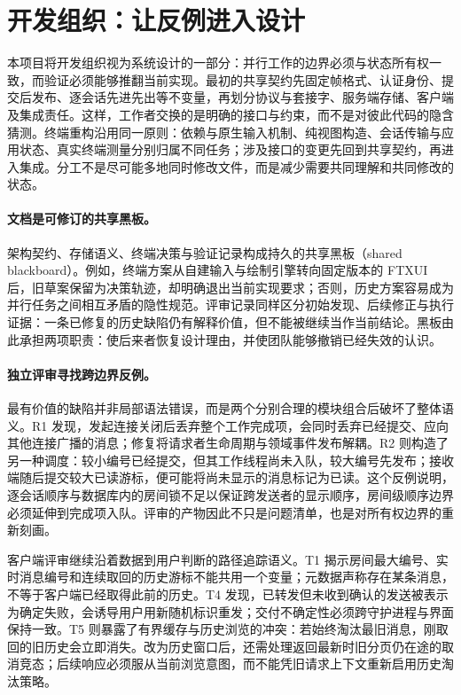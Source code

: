 \section{开发组织：让反例进入设计}
\label{sec:process}

本项目将开发组织视为系统设计的一部分：并行工作的边界必须与状态所有权一致，而验证必须能够推翻当前实现。最初的共享契约先固定帧格式、认证身份、提交后发布、逐会话先进先出等不变量，再划分协议与套接字、服务端存储、客户端及集成责任。这样，工作者交换的是明确的接口与约束，而不是对彼此代码的隐含猜测。终端重构沿用同一原则：依赖与原生输入机制、纯视图构造、会话传输与应用状态、真实终端测量分别归属不同任务；涉及接口的变更先回到共享契约，再进入集成。分工不是尽可能多地同时修改文件，而是减少需要共同理解和共同修改的状态。

\paragraph{文档是可修订的共享黑板。}
架构契约、存储语义、终端决策与验证记录构成持久的共享黑板（shared blackboard）。例如，终端方案从自建输入与绘制引擎转向固定版本的 FTXUI 后，旧草案保留为决策轨迹，却明确退出当前实现要求；否则，历史方案容易成为并行任务之间相互矛盾的隐性规范。评审记录同样区分初始发现、后续修正与执行证据：一条已修复的历史缺陷仍有解释价值，但不能被继续当作当前结论。黑板由此承担两项职责：使后来者恢复设计理由，并使团队能够撤销已经失效的认识。

\paragraph{独立评审寻找跨边界反例。}
最有价值的缺陷并非局部语法错误，而是两个分别合理的模块组合后破坏了整体语义。R1 发现，发起连接关闭后丢弃整个工作完成项，会同时丢弃已经提交、应向其他连接广播的消息；修复将请求者生命周期与领域事件发布解耦。R2 则构造了另一种调度：较小编号已经提交，但其工作线程尚未入队，较大编号先发布；接收端随后提交较大已读游标，便可能将尚未显示的消息标记为已读。这个反例说明，逐会话顺序与数据库内的房间锁不足以保证跨发送者的显示顺序，房间级顺序边界必须延伸到完成项入队。评审的产物因此不只是问题清单，也是对所有权边界的重新刻画。

客户端评审继续沿着数据到用户判断的路径追踪语义。T1 揭示房间最大编号、实时消息编号和连续取回的历史游标不能共用一个变量；元数据声称存在某条消息，不等于客户端已经取得此前的历史。T4 发现，已转发但未收到确认的发送被表示为确定失败，会诱导用户用新随机标识重发；交付不确定性必须跨守护进程与界面保持一致。T5 则暴露了有界缓存与历史浏览的冲突：若始终淘汰最旧消息，刚取回的旧历史会立即消失。改为历史窗口后，还需处理返回最新时旧分页仍在途的取消竞态；后续响应必须服从当前浏览意图，而不能凭旧请求上下文重新启用历史淘汰策略。

